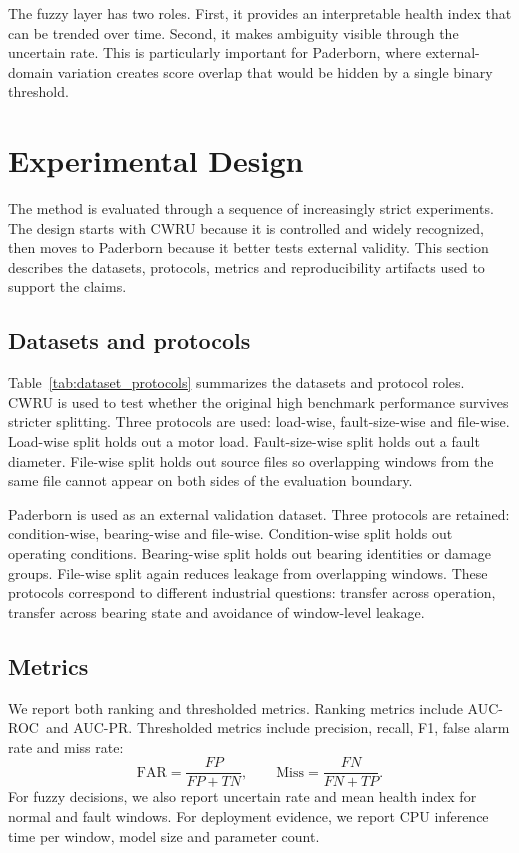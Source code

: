 \documentclass[pdflatex,sn-mathphys-num]{sn-jnl}
\newcommand{\rocauc}{AUC-ROC}
\newcommand{\prauc}{AUC-PR}
\begin{document}
The fuzzy layer has two roles. First, it provides an interpretable health index that can be trended over time. Second, it makes ambiguity visible through the uncertain rate. This is particularly important for Paderborn, where external-domain variation creates score overlap that would be hidden by a single binary threshold.

\section{Experimental Design}
\label{sec:experimental_design}

The method is evaluated through a sequence of increasingly strict experiments. The design starts with CWRU because it is controlled and widely recognized, then moves to Paderborn because it better tests external validity. This section describes the datasets, protocols, metrics and reproducibility artifacts used to support the claims.

\subsection{Datasets and protocols}

Table~\ref{tab:dataset_protocols} summarizes the datasets and protocol roles. CWRU is used to test whether the original high benchmark performance survives stricter splitting. Three protocols are used: load-wise, fault-size-wise and file-wise. Load-wise split holds out a motor load. Fault-size-wise split holds out a fault diameter. File-wise split holds out source files so overlapping windows from the same file cannot appear on both sides of the evaluation boundary.

Paderborn is used as an external validation dataset. Three protocols are retained: condition-wise, bearing-wise and file-wise. Condition-wise split holds out operating conditions. Bearing-wise split holds out bearing identities or damage groups. File-wise split again reduces leakage from overlapping windows. These protocols correspond to different industrial questions: transfer across operation, transfer across bearing state and avoidance of window-level leakage.



\subsection{Metrics}

We report both ranking and thresholded metrics. Ranking metrics include \rocauc\ and \prauc. Thresholded metrics include precision, recall, F1, false alarm rate and miss rate:
\begin{equation}
\mathrm{FAR}=\frac{FP}{FP+TN}, \qquad
\mathrm{Miss}=\frac{FN}{FN+TP}.
\end{equation}
For fuzzy decisions, we also report uncertain rate and mean health index for normal and fault windows. For deployment evidence, we report CPU inference time per window, model size and parameter count.
\end{document}

